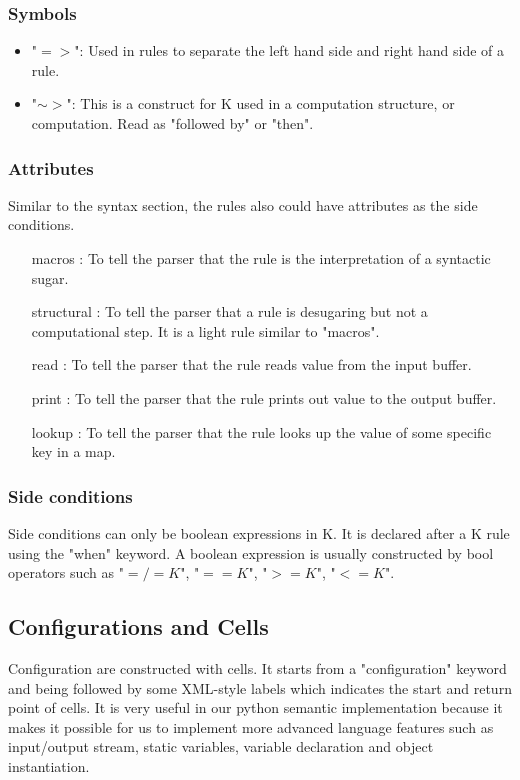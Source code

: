 \documentclass[a4paper]{article}
\begin{document}
\subsubsection{Symbols}
\begin{itemize}
    \item "$=>$": Used in rules to separate the left hand side and right hand side of a rule.
    \item "$\sim>$": This is a construct for K used in a computation structure, or computation. Read as "followed by" or "then". 
\end{itemize}
\subsubsection{Attributes}
Similar to the syntax section, the rules also could have attributes as the side conditions. 
\begin{itemize}
    \item [macros]: To tell the parser that the rule is the interpretation of a syntactic sugar.
    \item [structural]: To tell the parser that a rule is desugaring but not a computational step. It is a light rule similar to "macros".
    \item [read]: To tell the parser that the rule reads value from the input buffer.
    \item [print]: To tell the parser that the rule prints out value to the output buffer.
    \item [lookup]: To tell the parser that the rule looks up the value of some specific key in a map.
\end{itemize}
\subsubsection{Side conditions}
Side conditions can only be boolean expressions in K. It is declared after a K rule using the "when" keyword. A boolean expression is usually constructed by bool operators such as "$=/=K$", 
"$==K$", "$>=K$", "$<=K$".

\subsection{Configurations and Cells}
Configuration are constructed with cells. It starts from a "configuration" keyword and being followed by some XML-style labels which indicates the start and return point of cells. It is very useful in our python semantic implementation because it makes it possible for us to implement more advanced language features such as input/output stream, static variables, variable declaration and object instantiation.
\end{document}
